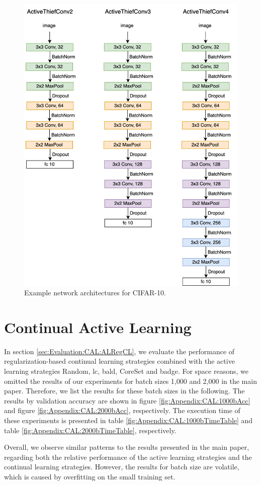 \begin{figure}[!htb]
    \centering
    \includegraphics[width=\linewidth]{images/ActiveThiefConvs.png}
    \caption{Example network architectures for CIFAR-10.}
    \label{fig:ActiveThiefArchitectures}
\end{figure}

\clearpage

\section{Continual Active Learning}
\label{sec:Appendix:ContinualActiveLearning}
In section \ref{sec:Evaluation:CAL:ALRegCL}, we evaluate the performance of regularization-based continual learning strategies combined with the active learning
strategies Random, \gls{lc}, \gls{bald}, CoreSet and \gls{badge}. For space reasons, we omitted the results of our experiments for batch sizes 1,000 and 2,000 in 
the main paper. Therefore, we list the results for these batch sizes in the following. The results by validation accuracy are shown in figure
\ref{fig:Appendix:CAL:1000bAcc} and figure \ref{fig:Appendix:CAL:2000bAcc}, respectively. The execution time of these experiments is presented in table 
\ref{fig:Appendix:CAL:1000bTimeTable} and table \ref{fig:Appendix:CAL:2000bTimeTable}, respectively. \par
Overall, we observe similar patterns to the results presented in the main paper, regarding both the relative performance of the active learning strategies and
the continual learning strategies. However, the results for batch size are volatile, which is caused by overfitting on the small training set. 


